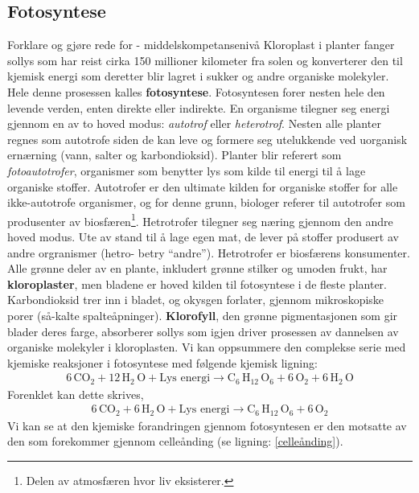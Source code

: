 \documentclass[main.tex]{subfiles}
\begin{document}
\subsection{Fotosyntese}
{\color{Blue}Forklare og gjøre rede for - middelskompetansenivå}
\newline\newline
Kloroplast i planter fanger sollys som har reist cirka 150 millioner kilometer fra solen og konverterer den til kjemisk energi som deretter blir lagret i sukker og andre organiske molekyler. Hele denne prosessen kalles \textbf{fotosyntese}.
\newline\newline
Fotosyntesen forer nesten hele den levende verden, enten direkte eller indirekte. En organisme tilegner seg energi gjennom en av to hoved modus: \emph{autotrof} eller \emph{heterotrof}. Nesten alle planter regnes som autotrofe siden de kan leve og formere seg utelukkende ved uorganisk ernærning (vann, salter og karbondioksid). Planter blir referert som \emph{fotoautotrofer}, organismer som benytter lys som kilde til energi til å lage organiske stoffer. Autotrofer er den ultimate kilden for organiske stoffer for alle ikke-autotrofe organismer, og for denne grunn, biologer referer til autotrofer som produsenter av biosfæren\footnote{Delen av atmosfæren hvor liv eksisterer.}. Hetrotrofer tilegner seg næring gjennom den andre hoved modus. Ute av stand til å lage egen mat, de lever på stoffer produsert av andre orgranismer (hetro- betry ``andre''). Hetrotrofer er biosfærens konsumenter.
\newline\newline
Alle grønne deler av en plante, inkludert grønne stilker og umoden frukt, har \textbf{kloroplaster}, men bladene er hoved kilden til fotosyntese i de fleste planter. Karbondioksid trer inn i bladet, og okysgen forlater, gjennom mikroskopiske porer (så-kalte spalteåpninger). \textbf{Klorofyll}, den grønne pigmentasjonen som gir blader deres farge, absorberer sollys som igjen driver prosessen av dannelsen av organiske molekyler i kloroplasten. Vi kan oppsummere den complekse serie med kjemiske reaksjoner i fotosyntese med følgende kjemisk ligning:
\begin{align*}
6\,\text{CO}_2 + 12\,\text{H}_2\,\text{O} + \text{Lys energi} \longrightarrow \text{C}_6\,\text{H}_{12}\,\text{O}_6 + 6\,\text{O}_2 + 6\,\text{H}_2\,\text{O}
\end{align*}
Forenklet kan dette skrives,
\begin{align}
\label{fotosyntese}
6\,\text{CO}_2 + 6\,\text{H}_2\,\text{O} + \text{Lys energi} \longrightarrow \text{C}_6\,\text{H}_{12}\,\text{O}_6 + 6\,\text{O}_2
\end{align}
Vi kan se at den kjemiske forandringen gjennom fotosyntesen er den motsatte av den som forekommer gjennom celleånding (se ligning: \ref{celleånding}).
\end{document}
